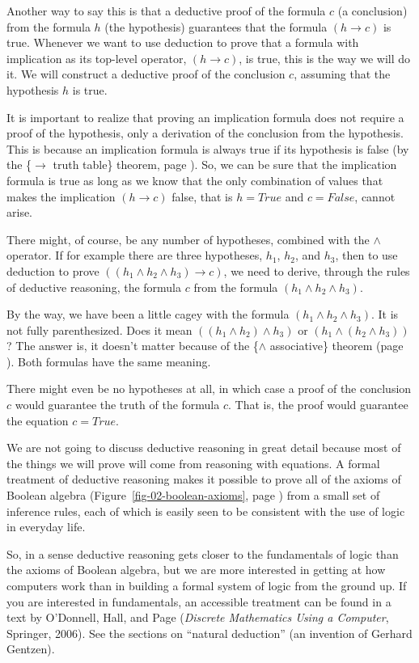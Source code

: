 Another way to say this is that a deductive proof of the formula $c$ (a conclusion)
from the formula $h$ (the hypothesis) guarantees that the formula
$(h \rightarrow c)$ is true.
Whenever we want to use deduction to prove that a formula with implication as its
top-level operator, $(h \rightarrow c)$, is true, this is the way we will do it.
We will construct a deductive proof of the conclusion $c$, assuming that
the hypothesis $h$ is true.

It is important to realize that proving an implication formula does
not require a proof of the hypothesis, only a derivation of the conclusion
from the hypothesis. This is because an implication formula is always
true if its hypothesis is false (by the \{$\rightarrow$ truth table\} theorem,
page \pageref{implication-truth-table}).
So, we can be sure that the implication formula is true as long as
we know that the only combination of values that makes the implication
$(h \rightarrow c)$ false, that is $h = True$ and $c = False$, cannot arise.

There might, of course, be any number of hypotheses, combined with
the $\wedge$ operator. If for example there are three hypotheses,
$h_1$, $h_2$, and $h_3$, then to use deduction to prove
$((h_1 \wedge h_2 \wedge h_3) \rightarrow c)$, we need to derive,
through the rules of deductive reasoning, the formula $c$ from
the formula $(h_1 \wedge h_2 \wedge h_3)$.

By the way, we have been a little cagey with the formula
$(h_1 \wedge h_2 \wedge h_3)$. It is not fully parenthesized.
Does it mean $((h_1 \wedge h_2) \wedge h_3)$ or
$(h_1 \wedge (h_2 \wedge h_3))$?
The answer is, it doesn't matter because of the \{$\wedge$ associative\}
theorem (page \pageref{and-associative}).
Both formulas have the same meaning.

There might even be no hypotheses at all, in which case a proof of the
conclusion $c$ would guarantee the truth of the formula
$c$. That is, the proof would guarantee the equation $c = True$.

We are not going to discuss deductive reasoning in great detail
because most of the things we will prove will come from reasoning
with equations. A formal treatment of deductive reasoning makes it
possible to prove all of the axioms of Boolean algebra
(Figure~\ref{fig-02-boolean-axioms}, page \pageref{fig-02-boolean-axioms})
from a small set of inference rules,
each of which is easily seen to be consistent with the use of logic in everyday life.

So, in a sense deductive reasoning gets closer to the fundamentals of
logic than the axioms of Boolean algebra, but we are more interested in getting at how
computers work than in building a formal system of logic from the ground up.
If you are interested in fundamentals, an accessible treatment can be found
in a text by O'Donnell, Hall, and Page
(\emph{Discrete Mathematics Using a Computer}, Springer, 2006).
See the sections on ``natural deduction'' (an invention of Gerhard Gentzen).

